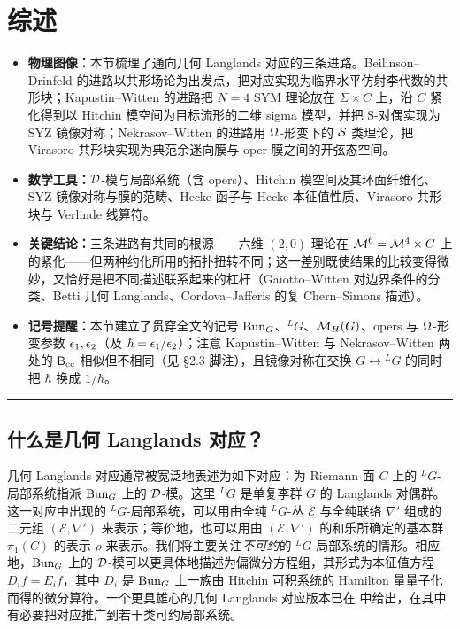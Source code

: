 \section{综述}

\begin{keytakeaways}
\begin{itemize}
  \item \textbf{物理图像：}本节梳理了通向几何 Langlands 对应的三条进路。Beilinson--Drinfeld 的进路以共形场论为出发点，把对应实现为临界水平仿射李代数的共形块；Kapustin--Witten 的进路把 $N=4$ SYM 理论放在 $\Sigma\times C$ 上，沿 $C$ 紧化得到以 Hitchin 模空间为目标流形的二维 sigma 模型，并把 S-对偶实现为 SYZ 镜像对称；Nekrasov--Witten 的进路用 $\Omega$-形变下的 $\mathcal{S}$ 类理论，把 Virasoro 共形块实现为典范余迷向膜与 oper 膜之间的开弦态空间。
  \item \textbf{数学工具：}$\mathcal{D}$-模与局部系统（含 opers）、Hitchin 模空间及其环面纤维化、SYZ 镜像对称与膜的范畴、Hecke 函子与 Hecke 本征值性质、Virasoro 共形块与 Verlinde 线算符。
  \item \textbf{关键结论：}三条进路有共同的根源——六维 $(2,0)$ 理论在 $\mathcal{M}^6=\mathcal{M}^4\times C$ 上的紧化——但两种约化所用的拓扑扭转不同；这一差别既使结果的比较变得微妙，又恰好是把不同描述联系起来的杠杆（Gaiotto--Witten 对边界条件的分类、Betti 几何 Langlands、Cordova--Jafferis 的复 Chern--Simons 描述）。
  \item \textbf{记号提醒：}本节建立了贯穿全文的记号 $\operatorname{Bun}_G$、${}^{L}G$、$\mathcal{M}_H(G)$、opers 与 $\Omega$-形变参数 $\epsilon_1,\epsilon_2$（及 $\hbar=\epsilon_1/\epsilon_2$）；注意 Kapustin--Witten 与 Nekrasov--Witten 两处的 $\mathsf{B}_{\rm cc}$ 相似但不相同（见 §2.3 脚注），且镜像对称在交换 $G\leftrightarrow{}^{L}G$ 的同时把 $\hbar$ 换成 $1/\hbar$。
\end{itemize}
\end{keytakeaways}

\bigskip
\noindent\rule{\textwidth}{0.6pt}
\bigskip

\subsection{什么是几何 Langlands 对应？}

几何 Langlands 对应通常被宽泛地表述为如下对应：为 Riemann 面 $C$ 上的 ${}^{L}G$-局部系统\glos 指派 $\operatorname{Bun}_G$ 上的 $\mathcal{D}$-模。这里 ${}^{L}G$ 是单复李群 $G$ 的 Langlands 对偶群。这一对应中出现的 ${}^{L}G$-局部系统，可以用由全纯 ${}^{L}G$-丛 $\mathcal{E}$ 与全纯联络 $\nabla'$ 组成的二元组 $(\mathcal{E},\nabla')$ 来表示；等价地，也可以用由 $(\mathcal{E},\nabla')$ 的和乐所确定的基本群 $\pi_1(C)$ 的表示 $\rho$ 来表示。我们将主要关注\emph{不可约}的 ${}^{L}G$-局部系统的情形。相应地，$\operatorname{Bun}_G$ 上的 $\mathcal{D}$-模可以更具体地描述为偏微分方程组，其形式为本征值方程 $D_i f= E_if$，其中 $D_i$ 是 $\operatorname{Bun}_G$ 上一族由 Hitchin 可积系统的 Hamilton 量量子化而得的微分算符。一个更具雄心的几何 Langlands 对应版本已在 \cite{AG} 中给出，在其中有必要把对应推广到若干类可约局部系统。

